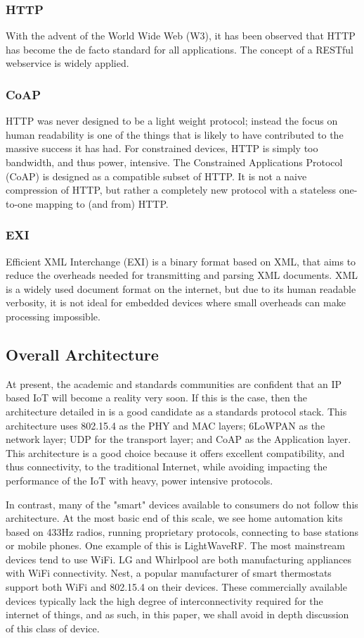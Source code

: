 \documentclass[12pt,journal,compsoc]{IEEEtran}
\begin{document}
\subsubsection{HTTP} 
With the advent of the World Wide Web (W3), it has been observed that HTTP has
become the de facto standard for all applications. The concept of a RESTful
webservice is widely applied.  

\subsubsection{CoAP}
HTTP was never designed to be a light weight protocol; instead the focus on
human readability is one of the things that is likely to have contributed to
the massive success it has had. For constrained devices, HTTP is simply too
bandwidth, and thus power, intensive. The Constrained Applications Protocol
(CoAP) is designed as a compatible subset of HTTP. It is not a naive
compression of HTTP, but rather a completely new protocol with a stateless
one-to-one mapping to (and from) HTTP. 

\subsubsection{EXI}
Efficient XML Interchange (EXI) is a binary format based on XML, that aims to
reduce the overheads needed for transmitting and parsing XML documents. XML is
a widely used document format on the internet, but due to its human readable
verbosity, it is not ideal for embedded devices where small overheads can make
processing impossible. 

\subsection{Overall Architecture}
At present, the academic and standards communities are confident that an IP
based IoT will become a reality very soon. If this is the case, then the
architecture detailed in \cite{Palattella2013} is a good candidate as a
standards protocol stack. This architecture uses 802.15.4 as the PHY and MAC
layers; 6LoWPAN as the network layer; UDP for the transport layer; and CoAP as
the Application layer. This architecture is a good choice because it offers
excellent compatibility, and thus connectivity, to the traditional Internet,
while avoiding impacting the performance of the IoT with heavy, power intensive
protocols. 

In contrast, many of the "smart" devices available to consumers do not follow
this architecture. At the most basic end of this scale, we see home automation
kits based on 433Hz radios, running proprietary protocols, connecting to base
stations or mobile phones. One example of this is LightWaveRF. The most
mainstream devices tend to use WiFi. LG and Whirlpool are both manufacturing
appliances with WiFi connectivity. Nest, a popular manufacturer of smart
thermostats support both WiFi and 802.15.4 on their devices.  These
commercially available devices typically lack the high degree of
interconnectivity required for the internet of things, and as such, in this
paper, we shall avoid in depth discussion of this class of device.  
\end{document}
